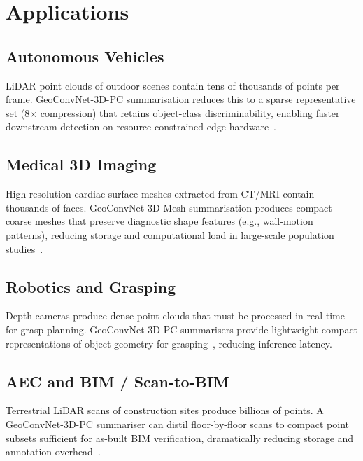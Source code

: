 \documentclass[10pt,conference]{IEEEtran}
\begin{document}
\section{Applications}
\label{sec:applications}

\subsection{Autonomous Vehicles}

LiDAR point clouds of outdoor scenes contain tens of thousands of points
per frame.  GeoConvNet-3D-PC summarisation reduces this to a sparse
representative set (8$\times$ compression) that retains object-class
discriminability, enabling faster downstream detection on resource-constrained
edge hardware~\cite{li2020deep}.

\subsection{Medical 3D Imaging}

High-resolution cardiac surface meshes extracted from CT/MRI contain
thousands of faces.  GeoConvNet-3D-Mesh summarisation produces compact
coarse meshes that preserve diagnostic shape features (e.g., wall-motion
patterns), reducing storage and computational load in large-scale
population studies~\cite{litjens2017survey}.

\subsection{Robotics and Grasping}

Depth cameras produce dense point clouds that must be processed in
real-time for grasp planning.  GeoConvNet-3D-PC summarisers provide
lightweight compact representations of object geometry for
grasping~\cite{qi2018frustum}, reducing inference latency.

\subsection{AEC and BIM / Scan-to-BIM}

Terrestrial LiDAR scans of construction sites produce billions of points.
A GeoConvNet-3D-PC summariser can distil floor-by-floor scans to
compact point subsets sufficient for as-built BIM verification, dramatically
reducing storage and annotation overhead~\cite{armeni2016semanticS3DIS}.
\end{document}
